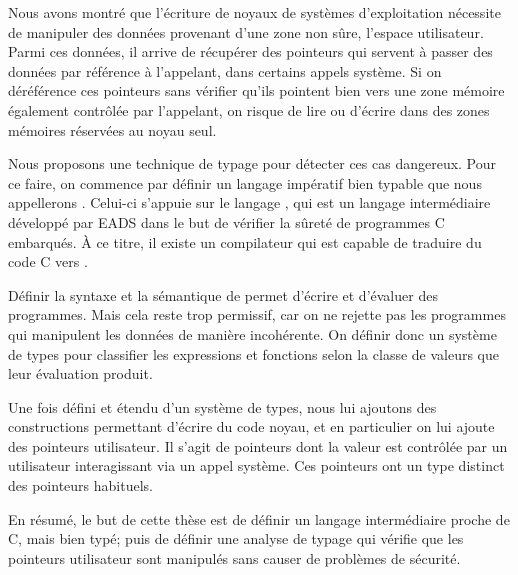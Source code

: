 
Nous avons montré que l'écriture de noyaux de systèmes d'exploitation nécessite
de manipuler des données provenant d'une zone non sûre, l'espace utilisateur.
Parmi ces données, il arrive de récupérer des pointeurs qui servent à passer des
données par référence à l'appelant, dans certains appels système. Si on
déréférence ces pointeurs sans vérifier qu'ils pointent bien vers une zone
mémoire également contrôlée par l'appelant, on risque de lire ou d'écrire dans
des zones mémoires réservées au noyau seul.

Nous proposons une technique de typage pour détecter ces cas dangereux. Pour ce
faire, on commence par définir un langage impératif bien typable que nous
appellerons \langname.
Celui-ci s'appuie sur le langage \newspeak, qui est un langage intermédiaire
développé par EADS dans le but de vérifier la sûreté de programmes C embarqués.
À ce titre, il existe un compilateur qui est capable de traduire du code C vers
\newspeak.

Définir la syntaxe et la sémantique de \langname permet d'écrire et d'évaluer
des programmes. Mais cela reste trop permissif, car on ne rejette pas les
programmes qui manipulent les données de manière incohérente. On définir donc un
système de types pour classifier les expressions et fonctions selon la classe de
valeurs que leur évaluation produit.

Une fois \langname défini et étendu d'un système de types, nous lui ajoutons des
constructions permettant d'écrire du code noyau, et en particulier on lui ajoute
des pointeurs utilisateur. Il s'agit de pointeurs dont la valeur est contrôlée
par un utilisateur interagissant via un appel système. Ces pointeurs ont un type
distinct des pointeurs habituels.

En résumé, le but de cette thèse est de définir un langage intermédiaire proche
de C, mais bien typé; puis de définir une analyse de typage qui vérifie que les
pointeurs utilisateur sont manipulés sans causer de problèmes de sécurité.

